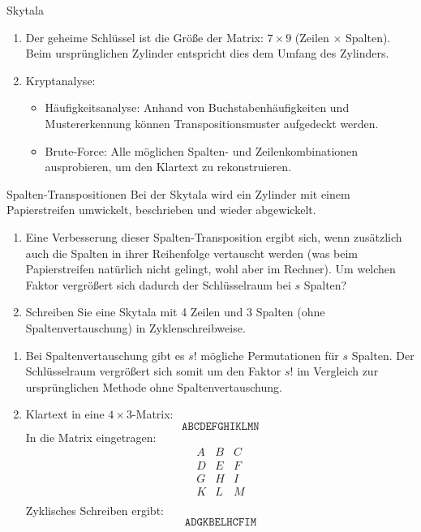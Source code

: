 \documentclass{article}
\begin{document}
\begin{exercise}{Skytala}
\begin{solution}
\begin{enumerate}
        \item Der geheime Schlüssel ist die Größe der Matrix: $ 7 \times 9 $ (Zeilen $\times$ Spalten). Beim ursprünglichen Zylinder entspricht dies dem Umfang des Zylinders.
  
        \item Kryptanalyse:
        \begin{itemize}
            \item Häufigkeitsanalyse: Anhand von Buchstabenhäufigkeiten und Mustererkennung können Transpositionsmuster aufgedeckt werden.
            \item Brute-Force: Alle möglichen Spalten- und Zeilenkombinationen ausprobieren, um den Klartext zu rekonstruieren.
        \end{itemize}
    \end{enumerate}
  \end{solution}
\end{exercise}

\begin{exercise}{Spalten-Transpositionen}
  Bei der Skytala wird ein Zylinder mit einem Papierstreifen umwickelt, beschrieben und wieder abgewickelt.
  \begin{enumerate}
      \item Eine Verbesserung dieser Spalten-Transposition ergibt sich, wenn zusätzlich auch die Spalten in ihrer Reihenfolge vertauscht werden (was beim Papierstreifen natürlich nicht gelingt, wohl aber im Rechner). Um welchen Faktor vergrößert sich dadurch der Schlüsselraum bei $s$ Spalten?
      \item Schreiben Sie eine Skytala mit 4 Zeilen und 3 Spalten (ohne Spaltenvertauschung) in Zyklenschreibweise.
  \end{enumerate}

  \begin{solution}
    \begin{enumerate}
        \item Bei Spaltenvertauschung gibt es $ s! $ mögliche Permutationen für $ s $ Spalten. Der Schlüsselraum vergrößert sich somit um den Faktor $ s! $ im Vergleich zur ursprünglichen Methode ohne Spaltenvertauschung.
  
        \item Klartext in eine $ 4 \times 3 $-Matrix:
          \[
          \texttt{ABCDEFGHIKLMN}
          \]
          In die Matrix eingetragen:
          \[
          \begin{array}{ccc}
          A & B & C \\
          D & E & F \\
          G & H & I \\
          K & L & M \\
          \end{array}
          \]
          Zyklisches Schreiben ergibt:
          \[
          \texttt{ADGKBELHCFIM}
          \]
    \end{enumerate}
  \end{solution}
\end{exercise}
\end{document}

